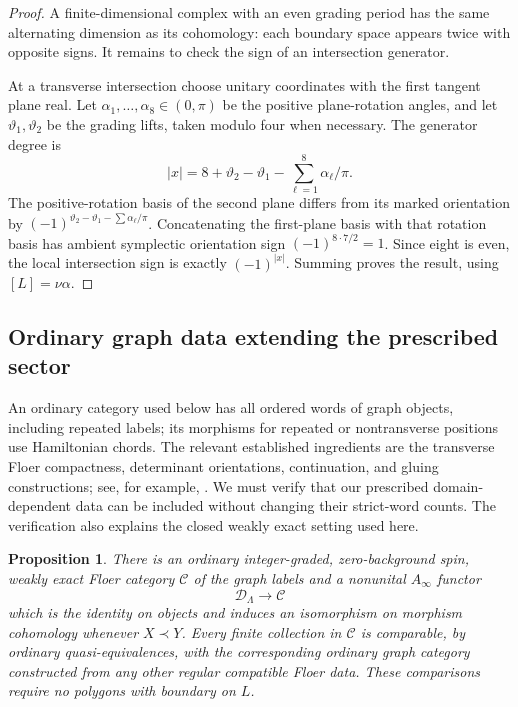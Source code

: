 \documentclass[11pt]{article}
\newtheorem{proposition}[theorem]{Proposition}
\theoremstyle{definition}
\theoremstyle{remark}
\newcommand{\Ainf}{A_\infty}
\numberwithin{equation}{section}
\begin{document}
\begin{proof}
A finite-dimensional complex with an even grading period has the same
alternating dimension as its cohomology: each boundary space appears
twice with opposite signs.  It remains to check the sign of an
intersection generator.

At a transverse intersection choose unitary coordinates with the first
tangent plane real.  Let \(\alpha_1,\ldots,\alpha_8\in(0,\pi)\) be the
positive plane-rotation angles, and let \(\vartheta_1,\vartheta_2\) be
the grading lifts, taken modulo four when necessary.  The generator
degree is
\begin{equation}\label{cat:cap-degree}
 |x|=8+\vartheta_2-\vartheta_1
                  -\sum_{\ell=1}^8\alpha_\ell/\pi.
\end{equation}
The positive-rotation basis of the second plane differs from its marked
orientation by
\((-1)^{\vartheta_2-\vartheta_1-\sum\alpha_\ell/\pi}\).
Concatenating the first-plane basis with that rotation basis has ambient
symplectic orientation sign \((-1)^{8\cdot7/2}=1\).  Since eight is even,
the local intersection sign is exactly \((-1)^{|x|}\).
Summing proves the result, using \([L]=\nu\alpha\).
\end{proof}

\subsection{Ordinary graph data extending the prescribed sector}

An ordinary category used below has all ordered words of graph objects,
including repeated labels; its morphisms for repeated or nontransverse
positions use Hamiltonian chords.  The relevant established ingredients
are the transverse Floer compactness, determinant orientations,
continuation, and gluing constructions; see, for example,
\cite{seidel}.  We must verify that our prescribed domain-dependent
data can be included without changing their strict-word counts.
The verification also explains the closed weakly exact setting used
here.

\begin{proposition}\label{cat:ordinary-comparison}
There is an ordinary integer-graded, zero-background spin, weakly exact
Floer category \(\mathcal C\) of the graph labels and a nonunital
\(\Ainf\) functor
\[
 \mathcal D_\Lambda\longrightarrow\mathcal C
\]
which is the identity on objects and induces an isomorphism on morphism
cohomology whenever \(X\prec Y\).
Every finite collection in \(\mathcal C\) is comparable, by ordinary
quasi-equivalences, with the corresponding ordinary graph category
constructed from any other regular compatible Floer data.
These comparisons require no polygons with boundary on \(L\).
\end{proposition}
\end{document}
